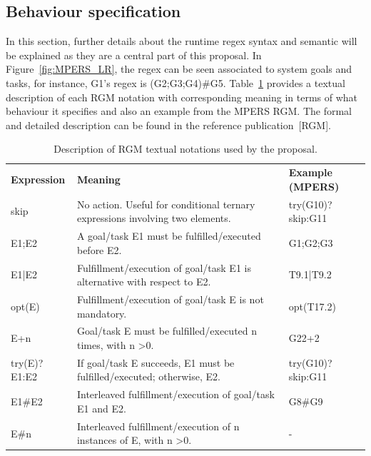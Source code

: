 \subsection{Behaviour specification}

In this section, further details about the runtime regex syntax and semantic will be explained as they are a central part of this proposal. In Figure~\ref{fig:MPERS_LR}, the regex can be seen associated to system goals and tasks, for instance, G1's regex is (G2;G3;G4)\#G5. Table~\ref{tab:RGM_REGEX} provides a textual description of each RGM notation with corresponding meaning in terms of what behaviour it specifies and also an example from the MPERS RGM. The formal and detailed description can be found in the reference publication~[RGM].

\begin{table}[h]\label{tab:RGM_REGEX}
{\renewcommand{\arraystretch}{1.5}
\begin{tabularx}{\textwidth}{@{}l|X|X@{}}
\toprule
\textbf{Expression} & \textbf{Meaning}                                                                   & \textbf{Example (MPERS)} \\ 
skip                & No action. Useful for conditional ternary expressions involving two elements.      & try(G10)?skip:G11        \\ 
E1;E2               & A goal/task E1 must be fulfilled/executed before E2.                               & G1;G2;G3                 \\ 
E1|E2               & Fulfillment/execution of goal/task E1 is alternative with respect to E2. & T9.1|T9.2                \\ 
opt(E)              & Fulfillment/execution of goal/task E is not mandatory.                             & opt(T17.2)               \\ 
E+n                 & Goal/task E must be fulfilled/executed n times, with n \textgreater 0.             & G22+2                    \\ 
try(E)?E1:E2        & If goal/task E succeeds, E1 must be fulfilled/executed; otherwise, E2.             & try(G10)?skip:G11        \\ 
E1\#E2              & Interleaved fulfillment/execution of goal/task E1 and E2.                          & G8\#G9                   \\ 
E\#n                & Interleaved fulfillment/execution of n instances of E, with n \textgreater 0.      & -                        \\ \bottomrule
\end{tabularx}
}
\caption{Description of RGM textual notations used by the proposal.}
\end{table}


